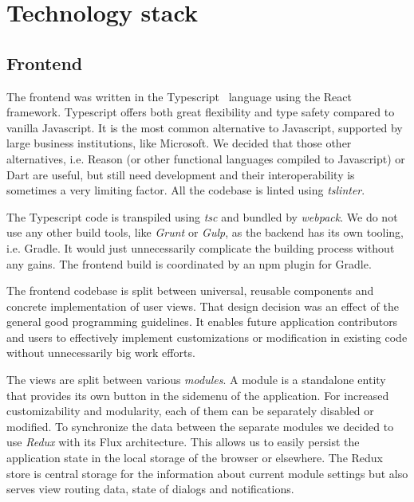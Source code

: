 \documentclass[licencjacka,en]{thesisclass}
\begin{document}
    \section{Technology stack}

    \subsection{Frontend}

    The frontend was written in the Typescript~\cite{Typescript} language
    using the React~\cite{React} framework.
    Typescript offers both great flexibility and type safety compared to vanilla Javascript.
    It is the most common alternative to Javascript,
    supported by large business institutions, like Microsoft.
    We decided that those other alternatives,
    i.e. Reason (or other functional languages compiled to Javascript) or Dart are useful,
    but still need development and their interoperability is sometimes a very limiting factor.
    All the codebase is linted using \textit{tslinter}.

    The Typescript code is transpiled
    using \textit{tsc} and bundled by \textit{webpack}.
    We do not use any other build tools, like
    \textit{Grunt} or \textit{Gulp}, as the backend has its own tooling, i.e. Gradle.
    It would just unnecessarily complicate the building process without any gains.
    The frontend build is coordinated by an npm plugin for Gradle.

    The frontend codebase is split between universal,
    reusable components
    and concrete implementation of user views.
    That design decision was an effect of the general good programming guidelines.
    It enables future application contributors and users
    to effectively implement customizations or modification
    in existing code without unnecessarily big work efforts.

    The views are split between various \textit{modules}.
    A module is a standalone entity that provides its
    own button in the sidemenu of the application.
    For increased customizability and modularity, each of them
    can be separately disabled or modified.
    To synchronize the data between the separate modules we decided
    to use \textit{Redux} with its Flux architecture.
    This allows us to easily persist the application state
    in the local storage of the browser or elsewhere.
    The Redux store is central storage for the information
    about current module settings but also serves view routing data,
    state of dialogs and notifications.
\end{document}
